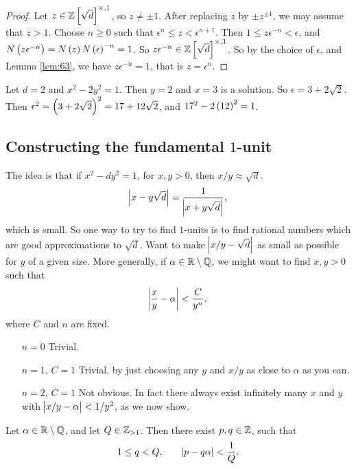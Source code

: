 \begin{proof}
Let $ z \in \Z\sbr{\sqrt{d}}^{\times, 1} $, so $ z \ne \pm 1 $. After replacing $ z $ by $ \pm z^{\pm 1} $, we may assume that $ z > 1 $. Choose $ n \ge 0 $ such that $ \epsilon^n \le z < \epsilon^{n + 1} $. Then $ 1 \le z\epsilon^{-n} < \epsilon $, and $ N\br{z\epsilon^{-n}} = N\br{z}N\br{\epsilon}^{-n} = 1 $. So $ z\epsilon^{-n} \in \Z\sbr{\sqrt{d}}^{\times, 1} $. So by the choice of $ \epsilon $, and Lemma \ref{lem:63}, we have $ z\epsilon^{-n} = 1 $, that is $ z = \epsilon^n $.
\end{proof}

\begin{example*}
Let $ d = 2 $ and $ x^2 - 2y^2 = 1 $. Then $ y = 2 $ and $ x = 3 $ is a solution. So $ \epsilon = 3 + 2\sqrt{2} $. Then $ \epsilon^2 = \br{3 + 2\sqrt{2}}^2 = 17 + 12\sqrt{2} $, and $ 17^2 - 2\br{12}^2 = 1 $.
\end{example*}

\pagebreak

\subsection{Constructing the fundamental \texorpdfstring{$ 1 $}{1}-unit}

The idea is that if $ x^2 - dy^2 = 1 $, for $ x, y > 0 $, then $ x / y \approx \sqrt{d} $.
$$ \abs{x - y\sqrt{d}} = \dfrac{1}{\abs{x + y\sqrt{d}}}, $$
which is small. So one way to try to find $ 1 $-units is to find rational numbers which are good approximations to $ \sqrt{d} $. Want to make $ \abs{x / y - \sqrt{d}} $ as small as possible for $ y $ of a given size. More generally, if $ \alpha \in \mathbb{R} \setminus \mathbb{Q} $, we might want to find $ x, y > 0 $ such that
$$ \abs{\dfrac{x}{y} - \alpha} < \dfrac{C}{y^n}, $$
where $ C $ and $ n $ are fixed.
\begin{itemize}[leftmargin=1in]
\item[$ n = 0 $] Trivial.
\item[$ n = 1 $, $ C = 1 $] Trivial, by just choosing any $ y $ and $ x / y $ as close to $ \alpha $ as you can.
\item[$ n = 2 $, $ C = 1 $] Not obvious. In fact there always exist infinitely many $ x $ and $ y $ with $ \abs{x / y - \alpha} < 1 / y^2 $, as we now show.
\end{itemize}

\begin{theorem}
\label{thm:65}
Let $ \alpha \in \mathbb{R} \setminus \mathbb{Q} $, and let $ Q \in \mathbb{Z}_{> 1} $. Then there exist $ p, q \in \mathbb{Z} $, such that
$$ 1 \le q < Q, \qquad \abs{p - q\alpha} < \dfrac{1}{Q}. $$
\end{theorem}

